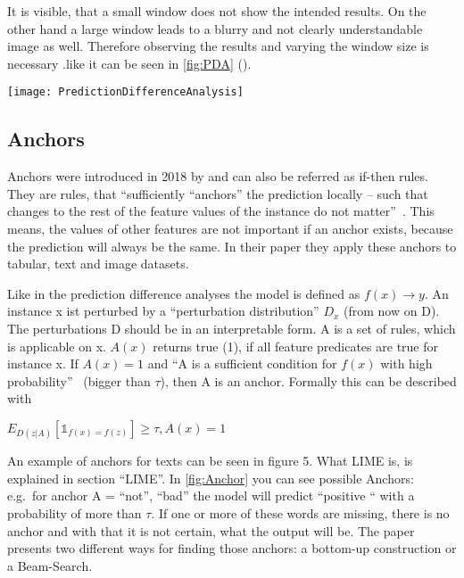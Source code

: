 \par
It is visible, that a small window does not show the intended results. On the other hand a large window leads to a blurry and not clearly understandable image as well. Therefore observing the results and varying the window size is necessary .like it can be seen in \cref{fig:PDA} (\cite{Zintgraf.2017}). 
\begin{figure*}[h]
    \center
    \texttt{[image: PredictionDifferenceAnalysis]}
    \caption{Prediction Difference Analysis with different window size~ \cite{Zintgraf.2017}}
    \label{fig:PDA}
\end{figure*}

\subsection{Anchors}
Anchors were introduced in 2018 by  and can also be referred as if-then rules. They are rules, that “sufficiently “anchors” the prediction locally – such that changes to the rest of the feature values of the instance do not matter”~\cite[1]{Ribeiro.2018}. This means, the values of other features are not important if an anchor exists, because the prediction will always be the same. In their paper they apply these anchors to tabular, text and image datasets.
\par
Like in the prediction difference analyses the model is defined as  
\(f(x) \rightarrow y\). 
An instance x ist perturbed by a “perturbation distribution” \(D_{x}\) (from now on D). The perturbations D should be in an interpretable form. A is a set of rules, which is applicable on x. \(A(x)\) returns true (1), if all feature predicates are true for instance x.
If 
\(A(x) = 1\)
 and “A is a sufficient condition for \(f(x)\) with high probability”~\cite[2]{Ribeiro.2018} (bigger than \(\tau\)), then A is an anchor. Formally this can be described with 
\par
\(E_{D(z|A)} [\mathbb{1}_{f(x)=f(z)}] ≥ \tau, A(x) = 1\)
 \par
An example of anchors for texts can be seen in figure 5. What LIME is, is explained in section “LIME”. In \cref{fig:Anchor} you can see possible Anchors: e.g.\ for anchor A = {“not”, “bad”} the model will predict “positive “ with a probability of more than \(\tau\). If one or more of these words are missing, there is no anchor and with that it is not certain, what the output will be.
The paper presents two different ways for finding those anchors: a bottom-up construction or a Beam-Search.
